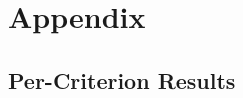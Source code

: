 \documentclass[11pt]{article}
\begin{document}
%


\clearpage
\appendix

\section{Appendix}\label{sec:appendix}


\subsection{Per-Criterion Results} \label{apx:tradeoffs}
\end{document}
